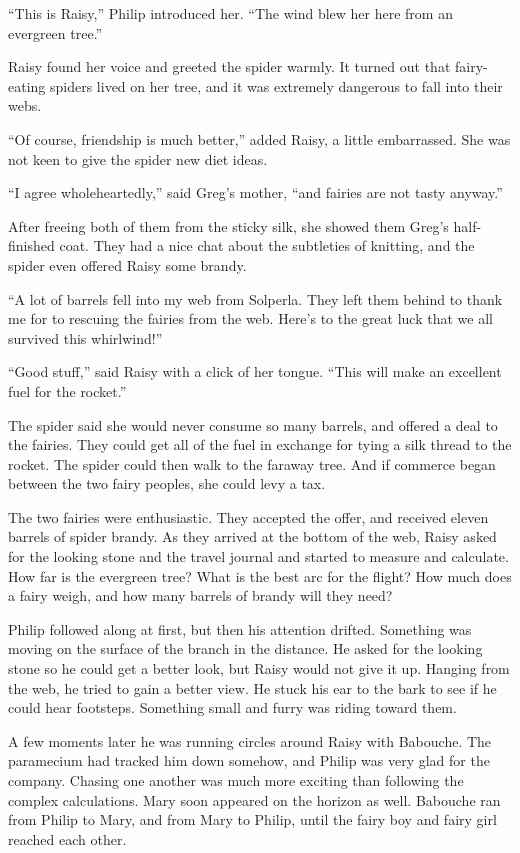 \documentclass[10pt, draft]{memoir}
\begin{document}
``This is Raisy,'' Philip introduced her. ``The wind blew her here from an
evergreen tree.''

Raisy found her voice and greeted the spider warmly. It turned out that
fairy-eating spiders lived on her tree, and it was extremely dangerous to fall
into their webs.

``Of course, friendship is much better,'' added Raisy, a little embarrassed.
She was not keen to give the spider new diet ideas.

``I agree wholeheartedly,'' said Greg's mother, ``and fairies are not tasty
anyway.''

After freeing both of them from the sticky silk, she showed them Greg's
half-finished coat. They had a nice chat about the subtleties of knitting, and
the spider even offered Raisy some brandy.

``A lot of barrels fell into my web from Solperla. They left them behind to
thank me for to rescuing the fairies from the web. Here's to the great luck
that we all survived this whirlwind!''

``Good stuff,'' said Raisy with a click of her tongue. ``This will make an
excellent fuel for the rocket.''

The spider said she would never consume so many barrels, and offered a deal to
the fairies. They could get all of the fuel in exchange for tying a silk thread
to the rocket. The spider could then walk to the faraway tree. And if commerce
began between the two fairy peoples, she could levy a tax.

The two fairies were enthusiastic. They accepted the offer, and received eleven
barrels of spider brandy. As they arrived at the bottom of the web, Raisy asked
for the looking stone and the travel journal and started to measure and
calculate. How far is the evergreen tree? What is the best arc for the flight?
How much does a fairy weigh, and how many barrels of brandy will they need?

Philip followed along at first, but then his attention drifted. Something was
moving on the surface of the branch in the distance. He asked for the looking
stone so he could get a better look, but Raisy would not give it up. Hanging
from the web, he tried to gain a better view. He stuck his ear to the bark to
see if he could hear footsteps. Something small and furry was riding toward
them.

A few moments later he was running circles around Raisy with Babouche. The
paramecium had tracked him down somehow, and Philip was very glad for the
company. Chasing one another was much more exciting than following the complex
calculations. Mary soon appeared on the horizon as well. Babouche ran from
Philip to Mary, and from Mary to Philip, until the fairy boy and fairy girl
reached each other.
\end{document}
